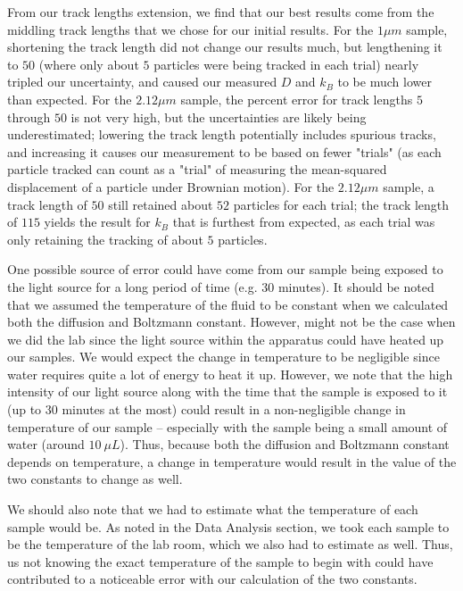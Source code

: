 \documentclass[twocolumn,amsmath,amssymb,pra, floatfix]{revtex4-2}
\begin{document}
From our track lengths extension, we find that our best results come from the middling track lengths that we chose for our initial results. For the $1 \si{\mu m}$ sample, shortening the track length did not change our results much, but lengthening it to $50$ (where only about $5$ particles were being tracked in each trial) nearly tripled our uncertainty, and caused our measured $D$ and $k_B$ to be much lower than expected. For the $2.12 \si{\mu m}$ sample, the percent error for track lengths $5$ through $50$ is not very high, but the uncertainties are likely being underestimated; lowering the track length potentially includes spurious tracks, and increasing it causes our measurement to be based on fewer "trials" (as each particle tracked can count as a "trial" of measuring the mean-squared displacement of a particle under Brownian motion). For the $2.12 \si{\mu m}$ sample, a track length of $50$ still retained about $52$ particles for each trial; the track length of $115$ yields the result for $k_B$ that is furthest from expected, as each trial was only retaining the tracking of about $5$ particles. 

One possible source of error could have come from our sample being exposed to the light source for a long period of time (e.g. 30 minutes).
It should be noted that we assumed the temperature of the fluid to be constant when we calculated both the diffusion and Boltzmann constant. However, might not be the case when we did the lab since the light source within the apparatus could have heated up our samples. We would expect the change in temperature to be negligible since water requires quite a lot of energy to heat it up. However, we note that the high intensity of our light source along with the time that the sample is exposed to it (up to 30 minutes at the most) could result in a non-negligible change in temperature of our sample -- especially with the sample being a small amount of water (around $10 \ \si{\mu L}$). Thus, because both the diffusion and Boltzmann constant depends on temperature, a change in temperature would result in the value of the two constants to change as well.

We should also note that we had to estimate what the temperature of each sample would be. As noted in the Data Analysis section, we took each sample to be the temperature of the lab room, which we also had to estimate as well. Thus, us not knowing the exact temperature of the sample to begin with could have contributed to a noticeable error with our calculation of the two constants.
\end{document}
